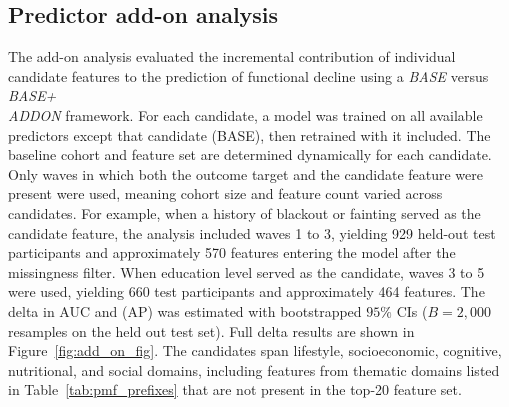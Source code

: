 \subsection{Predictor add-on analysis}\label{ssc:add_on_analysis}
The add-on analysis evaluated the incremental contribution of individual candidate features to the prediction of functional decline using a \emph{BASE} versus \emph{BASE+\\ADDON} framework. For each candidate, a model was trained on all available predictors except that candidate (BASE), then retrained with it included. The baseline cohort and feature set are determined dynamically for each candidate. Only waves in which both the outcome target and the candidate feature were present were used, meaning cohort size and feature count varied across candidates. For example, when a history of blackout or fainting served as the candidate feature, the analysis included waves 1 to 3, yielding 929 held-out test participants and approximately 570 features entering the model after the missingness filter. When education level served as the candidate, waves 3 to 5 were used, yielding 660 test participants and approximately 464 features. The delta in \gls{AUC} and (\gls{AP}) was estimated with bootstrapped $95\%$ \gls{CI}s ($B = 2{,}000$ resamples on the held out test set). Full delta results are shown in Figure~\ref{fig:add_on_fig}. The candidates span lifestyle, socioeconomic, cognitive, nutritional, and social domains, including features from thematic domains listed in Table~\ref{tab:pmf_prefixes} that are not present in the top-20 feature set.

